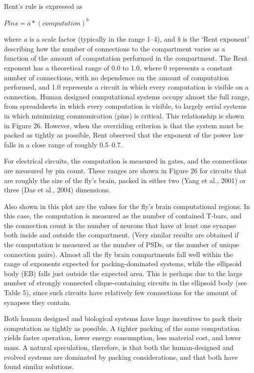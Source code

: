 \documentclass{article}
\begin{document}
Rent’s rule is expressed as

\begin{center}
$\mathit{Pins} = a * (\mathit{computation})^{b}$
\end{center}

\noindent where \emph{a} is a scale factor (typically in the range 1–4), and \emph{b} is the ‘Rent exponent’ describing how the number of connections to the compartment varies as a function of the amount of computation performed in the compartment. The Rent exponent has a theoretical range of 0.0 to 1.0, where 0 represents a constant number of connections, with no dependence on the amount of computation performed, and 1.0 represents a circuit in which every computation is visible on a connection. Human designed computational systems occupy almost the full range, from spreadsheets in which every computation is visible, to largely serial systems in which minimizing communication (pins) is critical. This relationship is shown in Figure 26. However, when the overriding criterion is that the system must be packed as tightly as possible, Rent observed that the exponent of the power law falls in a close range of roughly 0.5–0.7.

For electrical circuits, the computation is measured in gates, and the connections are measured by pin count. These ranges are shown in Figure 26 for circuits that are roughly the size of the fly’s brain, packed in either two (Yang et al., 2001) or three (Das et al., 2004) dimensions.

Also shown in this plot are the values for the fly’s brain computational regions. In this case, the computation is measured as the number of contained T-bars, and the connection count is the number of neurons that have at least one synapse both inside and outside the compartment. (Very similar results are obtained if the computation is measured as the number of PSDs, or the number of unique connection pairs). Almost all the fly brain compartments fall well within the range of exponents expected for packing-dominated systems, while the ellipsoid body (EB) falls just outside the expected area. This is perhaps due to the large number of strongly connected clique-containing circuits in the ellipsoid body (see Table 5), since such circuits have relatively few connections for the amount of synapses they contain.

Both human designed and biological systems have huge incentives to pack their computation as tightly as possible. A tighter packing of the same computation yields faster operation, lower energy consumption, less material cost, and lower mass. A natural speculation, therefore, is that both the human-designed and evolved systems are dominated by packing considerations, and that both have found similar solutions.
\end{document}
